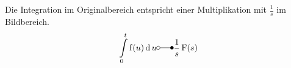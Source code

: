 Die Integration im Originalbereich entspricht einer Multiplikation mit $\frac{1}{s}$ im Bildbereich.
$$\int\limits_{0}^t \operatorname{f}(u) \operatorname{d} u \laplace \frac{1	}{s} \operatorname{F}(s)$$
